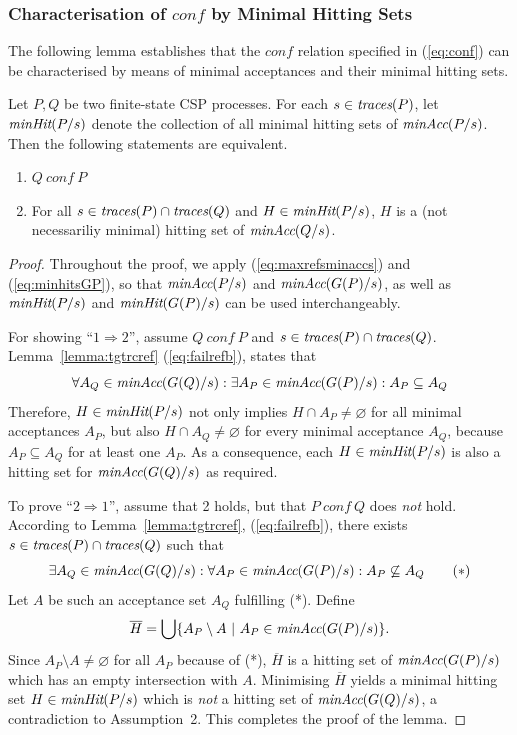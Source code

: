 \subsubsection*{Characterisation of $conf$ by Minimal Hitting Sets}
The following lemma establishes that the $conf$ relation specified in
(\ref{eq:conf}) can be characterised by means of minimal acceptances and
their minimal hitting sets.
%
\begin{lemma}
\label{lemma:hseta}
Let $P, Q$ be two finite-state CSP processes.
For each $s\in\text{\it traces}(P)$,
let $\text{\it minHit}(P/s)$ denote the
collection of all minimal hitting sets of $\text{\it minAcc}(P/s)$.
Then the following statements are equivalent.
\begin{enumerate}
\item $Q\ conf\ P$

\item For all $s\in\text{\it traces}(P)\cap \text{\it traces}(Q)$ and $H \in  \text{\it minHit}(P/s)$, $H$ is
a (not necessariliy minimal) hitting set of $\text{\it minAcc}(Q/s)$.
\end{enumerate}
\end{lemma}
\begin{proof}
Throughout the proof, we apply (\ref{eq:maxrefsminaccs}) and (\ref{eq:minhitsGP}), 
so that $\text{\it minAcc}(P/s)$ and $\text{\it minAcc}(G(P)/s)$, as well as 
$\text{\it minHit}(P/s)$ and $\text{\it minHit}(G(P)/s)$ can be used interchangeably.


For showing ``$1 \Rightarrow 2$'', assume   $Q\ conf\ P$ and $s\in\text{\it traces}(P)\cap
\text{\it traces}(Q)$. Lemma~\ref{lemma:tgtrcref} (\ref{eq:failrefb}), states that
\[
\forall A_Q\in\text{\it minAcc}(G(Q)/s):
\exists A_P\in\text{\it minAcc}(G(P)/s): A_P\subseteq A_Q
\]
Therefore, $H \in  \text{\it minHit}(P/s)$ not only implies $H\cap A_P\neq\varnothing$
for all minimal acceptances $A_P$, but also $H\cap A_Q\neq\varnothing$ for
every minimal acceptance $A_Q$, because $A_P\subseteq A_Q$ for at least one
$A_P$. As a consequence, each $H \in \text{\it minHit}(P/s)$ is also a hitting set for
$\text{\it minAcc}(G(Q)/s)$ as required.

To prove ``$2 \Rightarrow 1$'', assume that 2 holds, but that $P\ conf\ Q$
does {\it not} hold. According to Lemma~\ref{lemma:tgtrcref},
(\ref{eq:failrefb}), there exists $s\in\text{\it traces}(P)\cap \text{\it traces}(Q)$ such that
\[
\exists A_Q\in\text{\it minAcc}(G(Q)/s): \forall A_P\in\text{\it minAcc}(G(P)/s): A_P\not\subseteq A_Q
\qquad (*)
\]
Let $A$ be such an acceptance set $A_Q$ fulfilling (*).
Define
\[
\overline H = \bigcup\{ A_P \setminus A~|~A_P\in\text{\it minAcc}(G(P)/s) \}.
\]
Since $A_P \setminus A \neq\varnothing$ for all $A_P$ because of (*),
$\overline H$ is a hitting set of $\text{\it minAcc}(G(P)/s)$ which has an  empty
intersection with $A$. Minimising $\overline H$ yields   a minimal hitting
set $H\in \text{\it minHit}(P/s)$ which is {\it not} a hitting set of
$\text{\it minAcc}(G(Q)/s)$, a contradiction to Assumption~2. 
This completes the proof of the lemma. 
\xbox
\end{proof}

